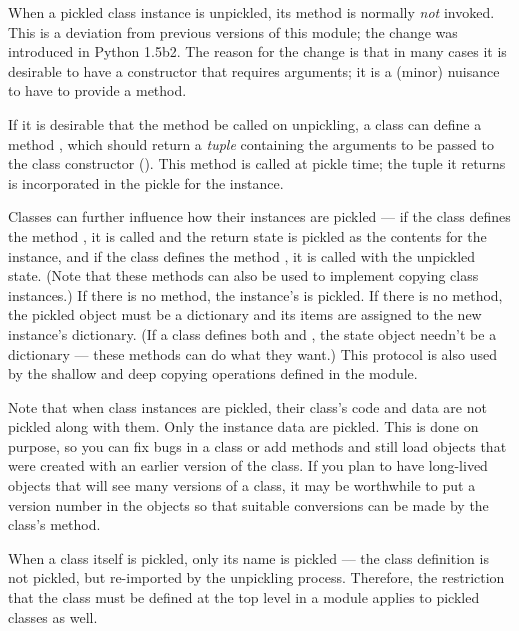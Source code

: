 When a pickled class instance is unpickled, its  method
is normally \emph{not} invoked.   This is a deviation
from previous versions of this module; the change was introduced in
Python 1.5b2.  The reason for the change is that in many cases it is
desirable to have a constructor that requires arguments; it is a
(minor) nuisance to have to provide a  method.

If it is desirable that the  method be called on
unpickling, a class can define a method ,
which should return a \emph{tuple} containing the arguments to be
passed to the class constructor ().  This method is
called at pickle time; the tuple it returns is incorporated in the
pickle for the instance.

Classes can further influence how their instances are pickled --- if the class
defines the method , it is called and the return
state is pickled as the contents for the instance, and if the class
defines the method , it is called with the
unpickled state.  (Note that these methods can also be used to
implement copying class instances.)  If there is no
 method, the instance's  is
pickled.  If there is no  method, the pickled
object must be a dictionary and its items are assigned to the new
instance's dictionary.  (If a class defines both 
and , the state object needn't be a dictionary
--- these methods can do what they want.)  This protocol is also used
by the shallow and deep copying operations defined in the 
module.

Note that when class instances are pickled, their class's code and
data are not pickled along with them.  Only the instance data are
pickled.  This is done on purpose, so you can fix bugs in a class or
add methods and still load objects that were created with an earlier
version of the class.  If you plan to have long-lived objects that
will see many versions of a class, it may be worthwhile to put a version
number in the objects so that suitable conversions can be made by the
class's  method.

When a class itself is pickled, only its name is pickled --- the class
definition is not pickled, but re-imported by the unpickling process.
Therefore, the restriction that the class must be defined at the top
level in a module applies to pickled classes as well.

